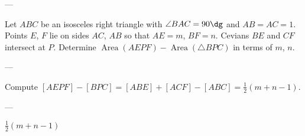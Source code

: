 
---

Let $ABC$ be an isosceles right triangle with $\angle BAC=90\dg$ and $AB=AC=1$. Points $E$, $F$ lie on sides $AC$, $AB$ so that $AE=m$, $BF=n$. Cevians $BE$ and $CF$ intersect at $P$. Determine $\operatorname{Area}(AEPF)-\operatorname{Area}(\triangle BPC)$ in terms of $m$, $n$.

---

Compute $[AEPF]-[BPC]=[ABE]+[ACF]-[ABC]=\tfrac12(m+n-1)$.

---

$\tfrac12(m+n-1)$
